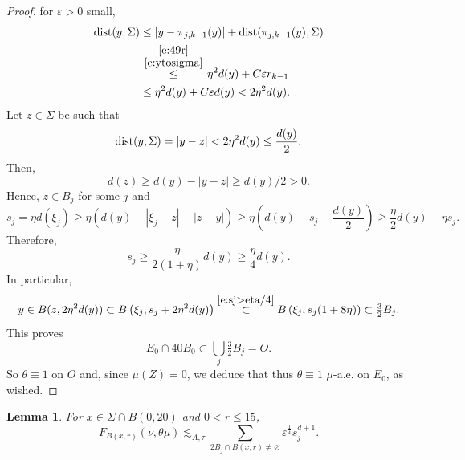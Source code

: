 \documentclass[11pt]{amsart}
\newcommand{\dist}{{\rm dist}}
\newcommand{\ve}{{\varepsilon}}
\newtheorem{lemma}[theorem]{Lemma}
\theoremstyle{definition}
\theoremstyle{remark}
\numberwithin{equation}{section}
\newcommand{\ps}[1]{\left( #1 \right)}
\def\lec{\lesssim}
\def\lec{\lesssim}
\begin{document}
\begin{proof}
	for $\ve>0$ small,
	\begin{align*}
	\dist(y,\Sigma)
	& \leq |y-\pi_{j,k-1}(y)| + \dist(\pi_{j,k-1}(y),\Sigma)\\
	& \stackrel{\eqref{e:49r} \atop \eqref{e:ytosigma}}{\leq} \eta^{2}d(y) + C\ve r_{k-1}\\
	& \leq \eta^{2}d(y)+ C\ve d(y)
	< 2\eta^{2}d(y).
	\end{align*}
		Let $z\in \Sigma$ be such that 
	\[
	\dist(y,\Sigma)=|y-z|<2\eta^{2}d(y)\leq\frac{d(y)}{2}.
	\]
	 Then,
	\[
	d(z)\geq d(y) - |y-z| \geq d(y)/2>0.
	\]
	Hence, $z\in B_{j}$ for some $j$ and
	\[
	s_{j} =   \eta   d(\xi_{j})\geq  \eta (d(y) -  |\xi_{j}-z|-|z-y|)
	\geq  \eta \ps{d(y) - s_{j} -\frac{d(y)}{2} }\geq \frac{\eta}{2} d(y) - \eta s_{j}.
	\]
	Therefore, 
	\begin{equation}
	\label{e:sj>eta/4}
	s_{j}\geq  \frac{\eta}{2(1+\eta)}d(y)\geq \frac{\eta}{4} d(y).
	\end{equation}
	In particular, 
    \[
	y\in B(z,2\eta^{2}d(y))
	\subset B\ps{\xi_{j},s_{j}+2\eta^{2}d(y)}
	\stackrel{\eqref{e:sj>eta/4}}{\subset} B\ps{\xi_{j},s_{j}(1+8\eta)}\subset \tfrac{3}{2} B_{j}.\]	
	This proves
	\begin{equation}\label{e:E040}
	E_{0}\cap 40 B_{0} \subset \bigcup_j \tfrac32B_j=O.
	\end{equation}
	So $\theta\equiv 1$ on $O$ and, since $\mu(Z)=0$, we deduce that thus $\theta\equiv 1$ $\mu$-a.e.
	on $E_0$, as wished.
	\end{proof}
	
\begin{lemma}
	For $x\in \Sigma\cap B(0,20)$ and $0<r\leq15$,
	\begin{equation}
	\label{e:nuthetamu}
		F_{B(x,r)}(\nu,\theta \mu) \lec_{A,\tau} \sum_{2B_{j}\cap B(x,r)\neq\varnothing} \ve^{\frac{1}{4}} s_{j}^{d+1}.
	\end{equation}
\end{lemma}
\end{document}
